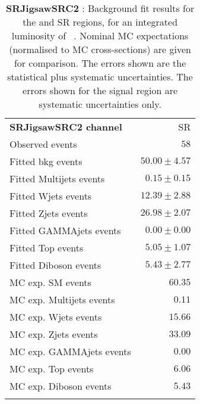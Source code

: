 

\begin{table}
\begin{center}
\setlength{\tabcolsep}{0.0pc}
{\tiny
\begin{tabular*}{\textwidth}{@{\extracolsep{\fill}}lr}
\noalign{\smallskip}\hline\noalign{\smallskip}
{\bf SRJigsawSRC2 channel}           & SR              \\[-0.05cm]
\noalign{\smallskip}\hline\noalign{\smallskip}
Observed events          & $58$                    \\
\noalign{\smallskip}\hline\noalign{\smallskip}
Fitted bkg events         & $50.00 \pm 4.57$              \\
\noalign{\smallskip}\hline\noalign{\smallskip}
        Fitted Multijets events         & $0.15 \pm 0.15$              \\
        Fitted Wjets events         & $12.39 \pm 2.88$              \\
        Fitted Zjets events         & $26.98 \pm 2.07$              \\
        Fitted GAMMAjets events         & $0.00 \pm 0.00$              \\
        Fitted Top events         & $5.05 \pm 1.07$              \\
        Fitted Diboson events         & $5.43 \pm 2.77$              \\
 \noalign{\smallskip}\hline\noalign{\smallskip}
MC exp. SM events              & $60.35$              \\
\noalign{\smallskip}\hline\noalign{\smallskip}
        MC exp. Multijets events         & $0.11$              \\
        MC exp. Wjets events         & $15.66$              \\
        MC exp. Zjets events         & $33.09$              \\
        MC exp. GAMMAjets events         & $0.00$              \\
        MC exp. Top events         & $6.06$              \\
        MC exp. Diboson events         & $5.43$              \\
\noalign{\smallskip}\hline\noalign{\smallskip}
\end{tabular*}
}
\end{center}
\caption{{\bf SRJigsawSRC2} : Background fit results for the  and SR regions, for an integrated luminosity of \ourintlumi~\ifb. Nominal MC expectations (normalised to MC cross-sections) are given for comparison. The errors shown are the statistical plus systematic uncertainties. The errors shown for the signal region are systematic uncertainties only.}
\label{table.results.systematics.in.logL.fit.SR.SRJigsawSRC2}
\end{table}
%